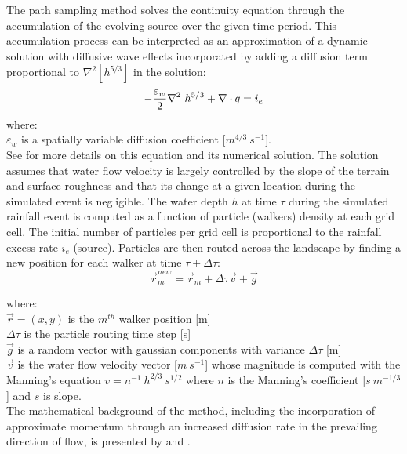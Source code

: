 \documentclass[gmd, manuscript]{copernicus}
\begin{document}
\noindent
The path sampling method solves the continuity equation 
through the accumulation of the evolving source over the given time period. 
This accumulation process can be interpreted as
an approximation of a dynamic solution with diffusive wave effects
incorporated by adding a diffusion term proportional to
$ \nabla^2 [h^{5/3}]$
in the solution:
\begin{equation}
\label{eq:difwater}
-{\varepsilon_w\over 2 }\nabla^2 ~ h^{5/3}
+\nabla \cdot \vec{q} = i_e
\end{equation}
{\small
\noindent
 where: \\
 \noindent
 \hspace*{0.5em} $\varepsilon_w$ is a spatially variable diffusion coefficient [$\unit{m}^{4/3}~\unit{s}^{-1}$]. \\
}
See \cite{Mitasova2004} for more details 
on this equation and its numerical solution.
The solution assumes that water flow velocity 
is largely controlled by the slope of the terrain and surface roughness 
and that its change at a given location during the simulated event is negligible. 
The water depth $h$ at time $\tau$ during the simulated rainfall event
 is computed as a function of particle (walkers) density at each grid cell. 
The initial number of particles per grid cell 
is proportional to the rainfall excess rate $i_e$ (source).
Particles are then routed across the landscape 
by finding a new position for each walker at time $\tau + \Delta \tau$:
\begin{equation}
\vec{r}_m^{new}=\vec{r}_m + \Delta \tau \vec{v} + \vec{g}
\end{equation}

{\small
\noindent
where: \\
\noindent
\hspace*{0.5em} $\vec{r} = (x, y)$ is the $m^{th}$ walker position [\unit{m}]\\
\hspace*{0.5em} $\Delta \tau$ is the particle routing time step [\unit{s}]\\
\hspace*{0.5em} $\vec{g}$ is a random vector with gaussian components with variance $\Delta \tau$ [\unit{m}]\\
\hspace*{0.5em} $\vec{v} $ is the water flow velocity vector [$\unit{m~s^{-1}}$]
whose magnitude is computed with the Manning's equation $v=n^{-1}~h^{2/3}~s^{1/2}$ 
where $n$ is the Manning's coefficient [$\unit{s~m^{-1/3}}$] and $s$ is slope.\\ 
}
%
\noindent
The mathematical background of the method,
including the incorporation of approximate momentum 
through an increased diffusion rate in the prevailing direction of flow,
is presented by \cite{Mitas1998} and \cite{Mitasova2004}.
\end{document}
